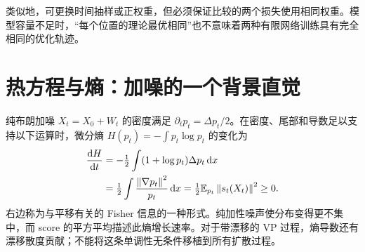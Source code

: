 类似地，可更换时间抽样或正权重，但必须保证比较的两个损失使用相同权重。模型容量不足时，“每个位置的理论最优相同”也不意味着两种有限网络训练具有完全相同的优化轨迹。

\section{热方程与熵：加噪的一个背景直觉}
纯布朗加噪 $X_t=X_0+W_t$ 的密度满足 $\partial_tp_t=\Delta p_t/2$。在密度、尾部和导数足以支持以下运算时，微分熵 $H(p_t)=-\int p_t\log p_t$ 的变化为
\begin{align}
 \frac{\mathop{}\!\mathrm{d} H}{\mathop{}\!\mathrm{d} t}
 &=-\tfrac12\int(1+\log p_t)\Delta p_t\mathop{}\!\mathrm{d} x\\
 &=\tfrac12\int\frac{\left\lVert\nabla p_t\right\rVert^2}{p_t}\mathop{}\!\mathrm{d} x
 =\tfrac12\mathbb{E}_{p_t}\left\lVert s_t(X_t)\right\rVert^2\ge0.
\end{align}
右边称为与平移有关的 Fisher 信息的一种形式。纯加性噪声使分布变得更不集中，而 score 的平方平均描述此熵增长速率。对于带漂移的 VP 过程，熵导数还有漂移散度贡献；不能将这条单调性无条件移植到所有扩散过程。


